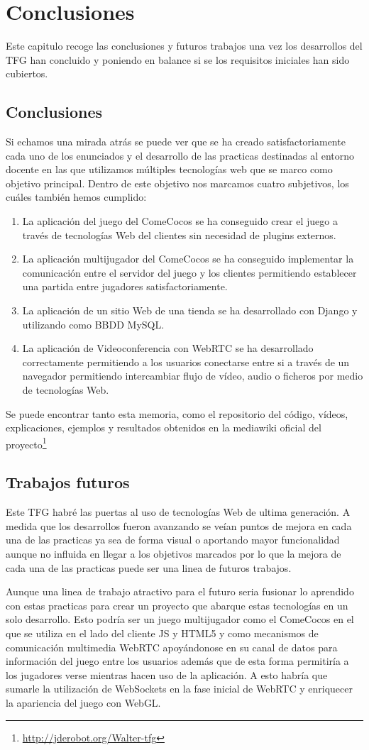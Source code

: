\chapter{Conclusiones}
Este capitulo recoge las conclusiones y futuros trabajos una vez los desarrollos del TFG han concluido y poniendo en balance si se los requisitos iniciales han sido cubiertos.
\section{Conclusiones}
Si echamos una mirada atrás se puede ver que se ha creado satisfactoriamente cada uno de los enunciados y el desarrollo de las practicas destinadas al entorno docente en las que utilizamos múltiples tecnologías web que se marco como objetivo principal. Dentro de este objetivo nos marcamos cuatro subjetivos, los cuáles también hemos cumplido:
\begin{enumerate}
    \item La aplicación del juego del ComeCocos se ha conseguido crear el juego a través de tecnologías Web del clientes sin necesidad de plugins externos.
    \item La aplicación multijugador del ComeCocos se ha conseguido implementar la comunicación entre el servidor del juego y los clientes permitiendo establecer una partida entre jugadores satisfactoriamente.
    \item La aplicación de un sitio Web de una tienda se ha desarrollado con Django y utilizando como BBDD MySQL.
    \item La aplicación de Videoconferencia con WebRTC se ha desarrollado correctamente permitiendo a los usuarios conectarse entre si a través de un navegador permitiendo intercambiar flujo de vídeo, audio o ficheros por medio de tecnologías Web. 
\end{enumerate}

Se puede encontrar tanto esta memoria, como el repositorio del código, vídeos, explicaciones, ejemplos y resultados obtenidos en la mediawiki oficial del proyecto\footnote{\url{http://jderobot.org/Walter-tfg}}
\section{Trabajos futuros}
Este TFG habré las puertas al uso de tecnologías Web de ultima generación. A medida que los desarrollos fueron avanzando se veían puntos de mejora en cada una de las practicas ya sea de forma visual o aportando mayor funcionalidad aunque no influida en llegar a los objetivos marcados por lo que la mejora de cada una de las practicas puede ser una linea de futuros trabajos.

Aunque una linea de trabajo atractivo para el futuro seria fusionar lo aprendido con estas practicas para crear un proyecto que abarque estas tecnologías en un solo desarrollo. Esto podría ser un juego multijugador como el ComeCocos en el que se utiliza en el lado del cliente JS y HTML5 y como mecanismos de comunicación multimedia WebRTC apoyándonose en su canal de datos para información del juego entre los usuarios además que de esta forma permitiría a los jugadores verse mientras hacen uso de la aplicación. A esto habría que sumarle la utilización de WebSockets en la fase inicial de WebRTC y enriquecer la apariencia del juego con WebGL.
